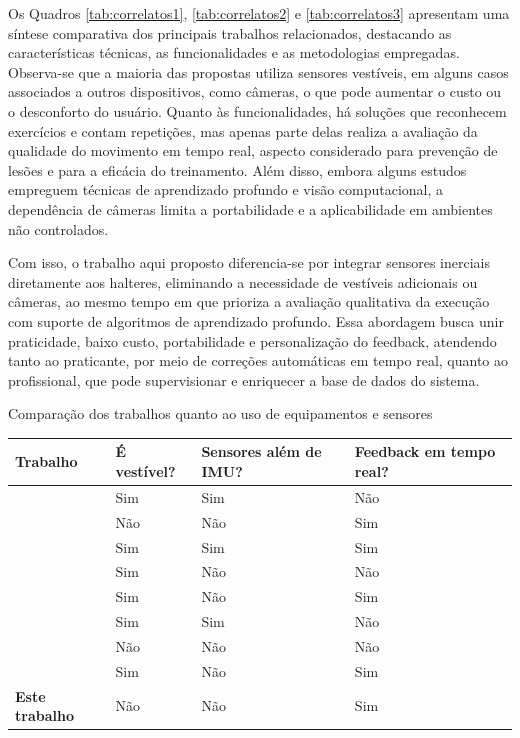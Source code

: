Os Quadros \ref{tab:correlatos1}, \ref{tab:correlatos2} e \ref{tab:correlatos3} apresentam uma síntese comparativa dos principais trabalhos relacionados, destacando as características técnicas, as funcionalidades e as metodologias empregadas. Observa-se que a maioria das propostas utiliza sensores vestíveis, em alguns casos associados a outros dispositivos, como câmeras, o que pode aumentar o custo ou o desconforto do usuário. Quanto às funcionalidades, há soluções que reconhecem exercícios e contam repetições, mas apenas parte delas realiza a avaliação da qualidade do movimento em tempo real, aspecto considerado para prevenção de lesões e para a eficácia do treinamento. Além disso, embora alguns estudos empreguem técnicas de aprendizado profundo e visão computacional, a dependência de câmeras limita a portabilidade e a aplicabilidade em ambientes não controlados.  

Com isso, o trabalho aqui proposto diferencia-se por integrar sensores inerciais diretamente aos halteres, eliminando a necessidade de vestíveis adicionais ou câmeras, ao mesmo tempo em que prioriza a avaliação qualitativa da execução com suporte de algoritmos de aprendizado profundo. Essa abordagem busca unir praticidade, baixo custo, portabilidade e personalização do feedback, atendendo tanto ao praticante, por meio de correções automáticas em tempo real, quanto ao profissional, que pode supervisionar e enriquecer a base de dados do sistema.

\begin{quadro}[H]
\centering
\caption{Comparação dos trabalhos quanto ao uso de equipamentos e sensores}
\label{tab:correlatos1}
\renewcommand{\arraystretch}{1.3}
\begin{tabular}{|l|C{2cm}|C{2cm}|C{2cm}|}
\hline
\textbf{Trabalho} & \textbf{É vestível?} & \textbf{Sensores além de IMU?} & \textbf{Feedback em tempo real?} \\
\hline
\cite{balkhi-multipurpose-nodate}            & Sim & Sim & Não \\\hline
\cite{chen-analysis-2024}       & Não & Não & Sim \\\hline
\cite{dzaja-quantitative-nodate}         & Sim & Sim & Sim \\\hline
\cite{emmanouil-two-2024}  & Sim & Não & Não \\\hline
\cite{gupta-yogahelp-2021}    & Sim & Não & Sim \\\hline
\cite{hwang-estimation-2023}      & Sim & Sim & Não \\\hline
\cite{pinto-aplicacao-2023}             & Não & Não & Não \\\hline
\cite{xia_volearn_2022}     & Sim & Não & Sim \\\hline
\textbf{Este trabalho}        & Não & Não & Sim \\
\hline
\end{tabular}
\end{quadro}

